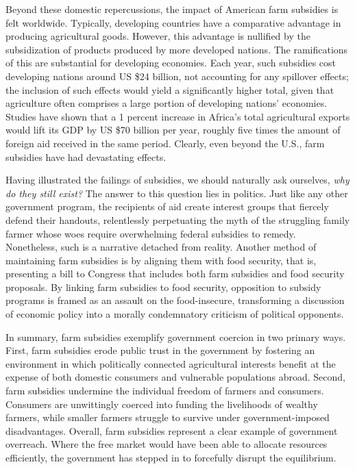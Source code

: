 \documentclass[12pt, a4paper, twoside]{article}
\begin{document}
Beyond these domestic repercussions, the impact of American farm subsidies is felt worldwide. Typically, developing countries have a comparative advantage in producing agricultural goods. However, this advantage is nullified by the subsidization of products produced by more developed nations. The ramifications of this are substantial for developing economies. Each year, such subsidies cost developing nations around US \$24 billion, not accounting for any spillover effects; the inclusion of such effects would yield a significantly higher total, given that agriculture often comprises a large portion of developing nations’ economies. Studies have shown that a 1 percent increase in Africa’s total agricultural exports would lift its GDP by US \$70 billion per year, roughly five times the amount of foreign aid received in the same period. Clearly, even beyond the U.S., farm subsidies have had devastating effects. 

Having illustrated the failings of subsidies, we should naturally ask ourselves, \emph{why do they still exist?}  The answer to this question lies in politics. Just like any other government program, the recipients of aid create interest groups that fiercely defend their handouts, relentlessly perpetuating the myth of the struggling family farmer whose woes require overwhelming federal subsidies to remedy. Nonetheless, such is a narrative detached from reality. Another method of maintaining farm subsidies is by aligning them with food security, that is, presenting a bill to Congress that includes both farm subsidies and food security proposals. By linking farm subsidies to food security, opposition to subsidy programs is framed as an assault on the food-insecure, transforming a discussion of economic policy into a morally condemnatory criticism of political opponents.  

In summary, farm subsidies exemplify government coercion in two primary ways. First, farm subsidies erode public trust in the government by fostering an environment in which politically connected agricultural interests benefit at the expense of both domestic consumers and vulnerable populations abroad. Second, farm subsidies undermine the individual freedom of farmers and consumers. Consumers are unwittingly coerced into funding the livelihoods of wealthy farmers, while smaller farmers struggle to survive under government-imposed disadvantages. Overall, farm subsidies represent a clear example of government overreach. Where the free market would have been able to allocate resources efficiently, the government has stepped in to forcefully disrupt the equilibrium. 
\end{document}
